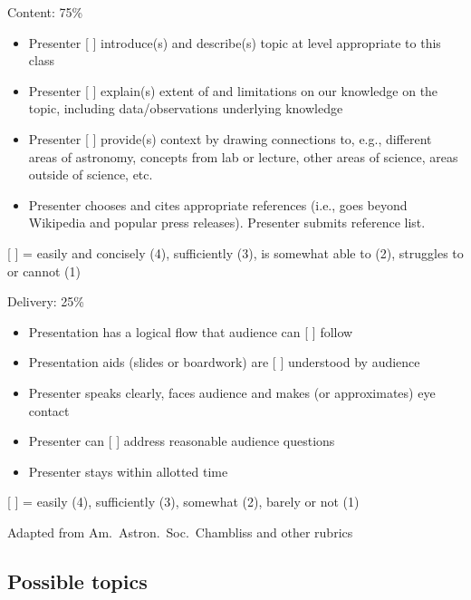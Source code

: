 \documentclass[11pt]{article}%
\begin{document}
Content: 75\%
\begin{itemize}[noitemsep]
\item Presenter [ \underline{\hspace{5mm}} ] introduce(s) and describe(s) topic
at level appropriate to this class
\item Presenter [ \underline{\hspace{5mm}} ] explain(s) extent of and
limitations on our knowledge on the topic, including data/observations
underlying knowledge
\item Presenter [ \underline{\hspace{5mm}} ] provide(s) context by drawing
connections to, e.g., different areas of astronomy, concepts from lab or
lecture, other areas of science, areas outside of science, etc.
\item Presenter chooses and cites appropriate references (i.e., goes beyond
Wikipedia and popular press releases).  Presenter submits reference list.
\end{itemize} {\small [ \underline{\hspace{3mm}} ] = easily and concisely (4), sufficiently (3),
is somewhat able to (2), struggles to or cannot (1)
}

Delivery: 25\%
\begin{itemize}[noitemsep]
\item Presentation has a logical flow that audience can [ \underline{\hspace{5mm}} ] follow
\item Presentation aids (slides or boardwork) are [ \underline{\hspace{5mm}} ] understood by audience
\item Presenter speaks clearly, faces audience and makes (or approximates) eye
contact
\item Presenter can [ \underline{\hspace{5mm}} ] address reasonable audience questions
\item Presenter stays within allotted time
\end{itemize}
{\small [ \underline{\hspace{3mm}} ] = easily (4), sufficiently (3), somewhat (2), barely or not (1)}

{\small Adapted from Am.~Astron.~Soc.~Chambliss and other rubrics}

\newpage\pagebreak

\subsection*{Possible topics}
\end{document}
